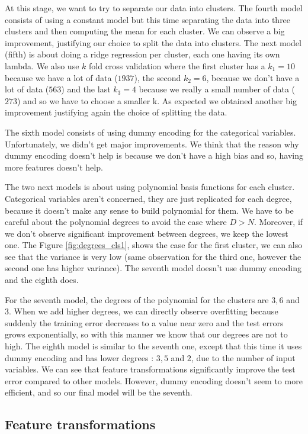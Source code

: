 \documentclass{article} %
\begin{document}
At this stage, we want to try to separate our data into clusters. The fourth model consists of using a constant model but this time separating the data into three clusters and then computing the mean for each cluster. We can observe a big improvement, justifying our choice to split the data into clusters. The next model (fifth) is about doing a ridge regression per cluster, each one having its own lambda. We also use $k$ fold cross validation where the first cluster has a $k_1=10$ because we have a lot of data ($1937$), the second $k_2=6$, because we don't have a lot of data ($563$) and the last $k_3=4$ because we really a small number of data ($273$) and so we have to choose a smaller k. As expected we obtained another big improvement justifying again the choice of splitting the data.

The sixth model consists of using dummy encoding for the categorical variables. Unfortunately, we didn't get major improvements. We think that the reason why dummy encoding doesn't help is because we don't have a high bias and so, having more features doesn't help.

The two next models is about using polynomial basis functions for each cluster. Categorical variables aren't concerned, they are just replicated for each degree, because it doesn't make any sense to build polynomial for them.  We have to be careful about the polynomial degrees to avoid the case where $D > N$. Moreover, if we don't observe significant improvement between degrees, we keep the lowest one. The Figure \ref{fig:degrees_cls1}, shows the case for the first cluster, we can also see that the variance is very low (same observation for the third one, however the second one has higher variance). The seventh model doesn't use dummy encoding and the eighth does.

For the seventh model, the degrees of the polynomial for the clusters are $3,6$ and $3$. When we add higher degrees, we can directly observe overfitting because suddenly the training error decreases to a value near zero and the test errors grows exponentially, so with this manner we know that our degrees are not to high. The eighth model is similar to the seventh one, except that this time it uses dummy encoding and has lower degrees : $3,5$ and $2$, due to the number of input variables. We can see that feature transformations significantly improve the test error compared to other models. However, dummy encoding doesn't seem to more efficient, and so our final model will be the seventh. 

\subsection{Feature transformations}
\end{document}
